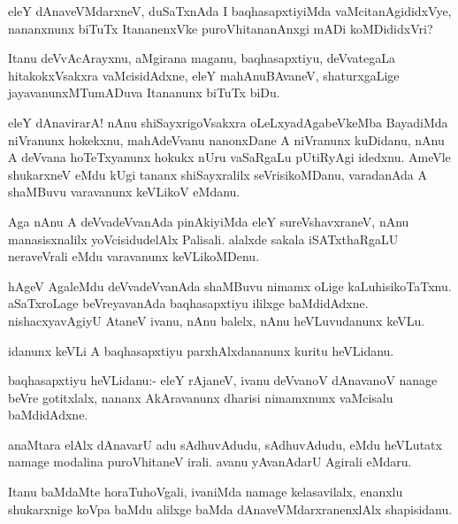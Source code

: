 \documentclass{article}
\begin{document}
\begin{mn}%
eleY dAnaveVMdarxneV, duSaTxnAda I baqhasapxtiyiMda
vaMcitanAgididxVye, nananxnunx biTuTx ItananenxVke puroVhitananAnxgi
mADi koMDididxVri?
\end{mn}

\begin{mn}%
Itanu deVvAcArayxnu, aMgirana maganu, baqhasapxtiyu, deVvategaLa
hitakokxVsakxra vaMcisidAdxne, eleY mahAnuBAvaneV, shaturxgaLige
jayavanunxMTumADuva Itananunx biTuTx biDu.
\end{mn}

\begin{mn}%
eleY dAnavirarA! nAnu shiSayxrigoVsakxra oLeLxyadAgabeVkeMba BayadiMda
niVranunx hokekxnu, mahAdeVvanu nanonxDane A niVranunx kuDidanu, nAnu
A deVvana hoTeTxyanunx hokukx nUru vaSaRgaLu pUtiRyAgi idedxnu. AmeVle
shukarxneV eMdu kUgi tananx shiSayxralilx seVrisikoMDanu, varadanAda A
shaMBuvu varavanunx keVLikoV eMdanu.
\end{mn}

\begin{mn}%
Aga nAnu A deVvadeVvanAda pinAkiyiMda eleY sureVshavxraneV, nAnu
manasisxnalilx yoVcisidudelAlx Palisali. alalxde sakala iSATxthaRgaLU
neraveVrali eMdu varavanunx keVLikoMDenu.
\end{mn}

\begin{mn}
hAgeV AgaleMdu deVvadeVvanAda shaMBuvu nimamx oLige
kaLuhisikoTaTxnu. aSaTxroLage beVreyavanAda baqhasapxtiyu ililxge
baMdidAdxne. nishacxyavAgiyU AtaneV ivanu, nAnu balelx, nAnu
heVLuvudanunx keVLu.
\end{mn}

\begin{mn}%
idanunx keVLi A baqhasapxtiyu parxhAlxdananunx kuritu heVLidanu.
\end{mn}

\begin{mn}%
baqhasapxtiyu heVLidanu:- eleY rAjaneV, ivanu deVvanoV dAnavanoV
nanage beVre gotitxlalx, nananx AkAravanunx dharisi nimamxnunx
vaMcisalu baMdidAdxne.
\end{mn}

\begin{mn}
anaMtara elAlx dAnavarU adu sAdhuvAdudu, sAdhuvAdudu, eMdu heVLutatx
namage modalina puroVhitaneV irali. avanu yAvanAdarU Agirali eMdaru.
\end{mn}

\begin{mn}
Itanu baMdaMte horaTuhoVgali, ivaniMda namage kelasavilalx, enanxlu
shukarxnige koVpa baMdu alilxge baMda dAnaveVMdarxranenxlAlx shapisidanu.
\end{mn}
\end{document}
